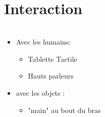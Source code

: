 \section{Interaction}
\begin{frame}
  \frametitle{}
    \begin{column}{.5\textwidth}
      \begin{itemize}
      \item Avec les humains:
        \begin{itemize}
        \item Tablette Tactile
        \item Hauts parleurs
        \end{itemize}
      \item avec les objets :
	\begin{itemize}
	\item "main" au bout du bras
	\end{itemize}
      \end{itemize}
    \end{column}
\end{frame}
